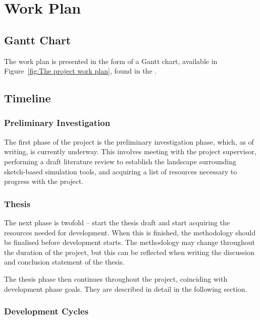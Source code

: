 \documentclass{article}
\begin{document}
\section{Work Plan}
\label{subsec:Work Plan}

\subsection{Gantt Chart}
\label{subsec:Gantt Chart}

The work plan is presented in the form of a Gantt chart, available in Figure~\ref{fig:The project work plan},
found in the \appendixname.

\subsection{Timeline}
\label{subsec:Timeline}

\subsubsection{Preliminary Investigation}
\label{subsubsec:Preliminary Investigation}

The first phase of the project is the preliminary investigation phase, which, as of writing, is currently 
underway. This involves meeting with the project supervisor, performing a draft literature review to 
establish the landscape surrounding sketch-based simulation tools, and acquiring a list of resources 
necessary to progress with the project.

\subsubsection{Thesis}
\label{subsubsec:Thesis}

The next phase is twofold -- start the thesis draft and start acquiring the resources needed for development.
When this is finished, the methodology should be finalised before development starts. The methodology may change
throughout the duration of the project, but this can be reflected when writing the discussion and conclusion 
statement of the thesis.

The thesis phase then continues throughout the project, coinciding with development phase goals. They are described 
in detail in the following section.

\subsubsection{Development Cycles}
\label{subsubsec:Development Cycles}
\end{document}
